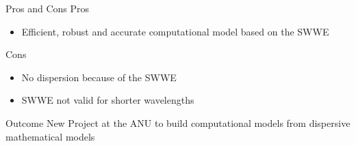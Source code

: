 \documentclass[pdf]{beamer}
\begin{document}
\begin{frame}{Pros and Cons}
	Pros
	\begin{itemize}
	\item Efficient, robust and accurate computational model based on the SWWE
	\end{itemize}
	Cons
	\begin{itemize}
	\item No dispersion because of the SWWE
	\item SWWE not valid for shorter wavelengths
	\end{itemize}
\end{frame}

\begin{frame}{Outcome}
 New Project at the ANU to build computational models from dispersive mathematical models
\end{frame}
\end{document}
